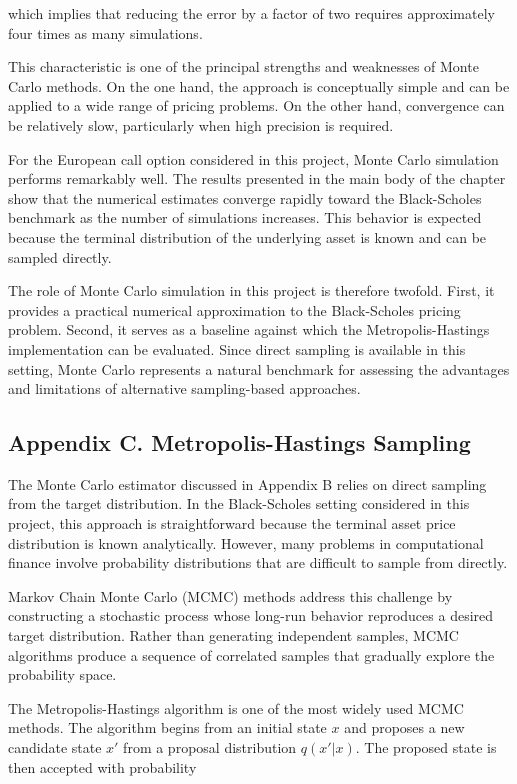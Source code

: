 \documentclass[
  12pt,
  letterpaper,
]{book}
\begin{document}
which implies that reducing the error by a factor of two requires
approximately four times as many simulations.

This characteristic is one of the principal strengths and weaknesses of
Monte Carlo methods. On the one hand, the approach is conceptually
simple and can be applied to a wide range of pricing problems. On the
other hand, convergence can be relatively slow, particularly when high
precision is required.

For the European call option considered in this project, Monte Carlo
simulation performs remarkably well. The results presented in the main
body of the chapter show that the numerical estimates converge rapidly
toward the Black-Scholes benchmark as the number of simulations
increases. This behavior is expected because the terminal distribution
of the underlying asset is known and can be sampled directly.

The role of Monte Carlo simulation in this project is therefore twofold.
First, it provides a practical numerical approximation to the
Black-Scholes pricing problem. Second, it serves as a baseline against
which the Metropolis-Hastings implementation can be evaluated. Since
direct sampling is available in this setting, Monte Carlo represents a
natural benchmark for assessing the advantages and limitations of
alternative sampling-based approaches.

\subsection{Appendix C. Metropolis-Hastings
Sampling}\label{appendix-c.-metropolis-hastings-sampling}

The Monte Carlo estimator discussed in Appendix B relies on direct
sampling from the target distribution. In the Black-Scholes setting
considered in this project, this approach is straightforward because the
terminal asset price distribution is known analytically. However, many
problems in computational finance involve probability distributions that
are difficult to sample from directly.

Markov Chain Monte Carlo (MCMC) methods address this challenge by
constructing a stochastic process whose long-run behavior reproduces a
desired target distribution. Rather than generating independent samples,
MCMC algorithms produce a sequence of correlated samples that gradually
explore the probability space.

The Metropolis-Hastings algorithm is one of the most widely used MCMC
methods. The algorithm begins from an initial state \(x\) and proposes a
new candidate state \(x'\) from a proposal distribution \(q(x'|x)\). The
proposed state is then accepted with probability
\end{document}
